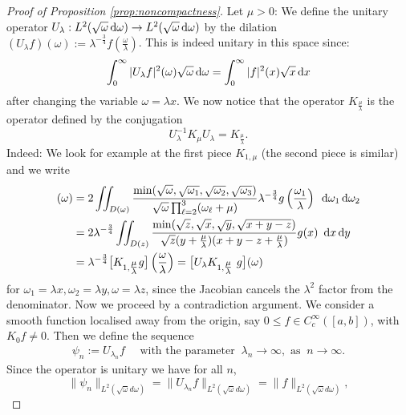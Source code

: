\documentclass[reqno,11pt,letterpaper]{amsart}
\numberwithin{equation}{section}
\newcommand{\dd}{\, {\rm d}}
\begin{document}
\begin{proof}[Proof of Proposition \ref{prop:noncompactness}]
    
 Let $\mu>0$: We define the unitary operator 
$U_\lambda : L^2(\sqrt{\omega}\dd \omega) \to L^2(\sqrt{\omega} \dd \omega)$ by the dilation  $(U_{\lambda}f)(\omega):= \lambda^{-\frac{3}{4}} f \left( \frac{\omega}{\lambda}\right)$. This is indeed unitary in this space since: 
$$ \int_0^\infty |U_{\lambda}f|^2 (\omega) \sqrt{\omega}\dd \omega = \int_0^\infty |f|^2(x) \sqrt{x} \dd x $$
after changing the variable $\omega = \lambda x$. 
We now notice that the operator $K_{\tfrac{\mu}{\lambda}}$ is the operator defined by the conjugation $$U_\lambda^{-1} K_\mu U_\lambda = K_{\tfrac{\mu}{\lambda}}.$$ Indeed: We look for example at the first piece $K_{1,\mu}$ (the second piece is similar) and we write 
\begin{align*} 
[K_{1,\mu} U_\lambda g](\omega) &= 2 \iint_{D(\omega)} \frac{\operatorname{min}(\sqrt{\omega},\sqrt{\omega_1}, \sqrt{\omega_2}, \sqrt{\omega_3})}{\sqrt{\omega}\prod_{\ell=2}^3 (\omega_\ell+\mu)} \lambda^{-\frac{3}{4}}  g\left(\frac{\omega_1}{\lambda}\right)\  \dd \omega_1 \dd \omega_2 \\ & = 
 2 \lambda^{-\frac{3}{4}}\iint_{D(z)} 
  \frac{\operatorname{min}(\sqrt{z},\sqrt{x}, \sqrt{y}, \sqrt{x+y-z})}{\sqrt{z} (y+\tfrac{\mu}{\lambda})(x+y-z+\tfrac{\mu}{\lambda})} g(x)
  \ \dd x \dd y 
    \\ & = \lambda^{-\frac{3}{4}} \big[ K_{1,\tfrac{\mu}{\lambda}}  g \big] \left( \frac{\omega}{\lambda}\right) = \big[U_\lambda K_{1,\tfrac{\mu}{\lambda}}\ g \big](\omega) 
    \end{align*}
    for $\omega_1 = \lambda x, \omega_2 = \lambda y, \omega = \lambda z$, since the Jacobian cancels the $\lambda^2$ factor from the denominator. 
    Now we proceed by a contradiction argument. We consider a smooth function localised away from the origin, say $0\leq f \in C_c^\infty([a,b])$, with $K_0 f \neq 0$. Then we define the sequence 
    \begin{align}
    \psi_n:= U_{\lambda_n} f \quad \text{ with the parameter } \ \lambda_n \to \infty, \text{ as } \ n \to \infty.\label{EPsin}
    \end{align}
     Since the operator is unitary we have for all $n$, 
 $$
\|\psi_n\|_{L^2(\sqrt{\omega}d\omega)} = \| U_{\lambda_n}f\|_{L^2(\sqrt{\omega}d\omega)} = \|f\|_{L^2(\sqrt{\omega}d\omega)},
$$
\end{proof}
\end{document}
